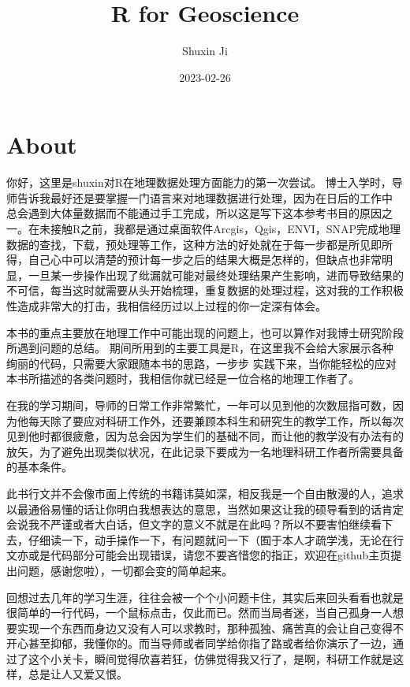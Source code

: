 \documentclass[
]{book}
\title{R for Geoscience}
\author{Shuxin Ji}
\date{2023-02-26}
\begin{document}
\maketitle

{
\setcounter{tocdepth}{1}
\tableofcontents
}
\hypertarget{about}{%
\chapter*{About}\label{about}}

你好，这里是shuxin对R在地理数据处理方面能力的第一次尝试。 博士入学时，导师告诉我最好还是要掌握一门语言来对地理数据进行处理，因为在日后的工作中 总会遇到大体量数据而不能通过手工完成，所以这是写下这本参考书目的原因之一。在未接触R之前，我都是通过桌面软件Arcgis，Qgis，ENVI，SNAP完成地理数据的查找，下载，预处理等工作，这种方法的好处就在于每一步都是所见即所得，自己心中可以清楚的预计每一步之后的结果大概是怎样的，但缺点也非常明显，一旦某一步操作出现了纰漏就可能对最终处理结果产生影响，进而导致结果的不可信，每当这时就需要从头开始梳理，重复数据的处理过程，这对我的工作积极性造成非常大的打击，我相信经历过以上过程的你一定深有体会。

本书的重点主要放在地理工作中可能出现的问题上，也可以算作对我博士研究阶段所遇到问题的总结。 期间所用到的主要工具是R，在这里我不会给大家展示各种绚丽的代码，只需要大家跟随本书的思路，一步步 实践下来，当你能轻松的应对本书所描述的各类问题时，我相信你就已经是一位合格的地理工作者了。

在我的学习期间，导师的日常工作非常繁忙，一年可以见到他的次数屈指可数，因为他每天除了要应对科研工作外，还要兼顾本科生和研究生的教学工作，所以每次见到他时都很疲惫，因为总会因为学生们的基础不同，而让他的教学没有办法有的放矢，为了避免出现类似状况，在此记录下要成为一名地理科研工作者所需要具备的基本条件。

此书行文并不会像市面上传统的书籍讳莫如深，相反我是一个自由散漫的人，追求以最通俗易懂的话让你明白我想表达的意思，当然如果这让我的硕导看到的话肯定会说我不严谨或者大白话，但文字的意义不就是在此吗？所以不要害怕继续看下去，仔细读一下，动手操作一下，有问题就问一下（囿于本人才疏学浅，无论在行文亦或是代码部分可能会出现错误，请您不要吝惜您的指正，欢迎在github主页提出问题，感谢您啦），一切都会变的简单起来。

回想过去几年的学习生涯，往往会被一个个小问题卡住，其实后来回头看看也就是很简单的一行代码，一个鼠标点击，仅此而已。然而当局者迷，当自己孤身一人想要实现一个东西而身边又没有人可以求教时，那种孤独、痛苦真的会让自己变得不开心甚至抑郁，我懂你的。而当导师或者同学给你指了路或者给你演示了一边，通过了这个小关卡，瞬间觉得欣喜若狂，仿佛觉得我又行了，是啊，科研工作就是这样，总是让人又爱又恨。
\end{document}
